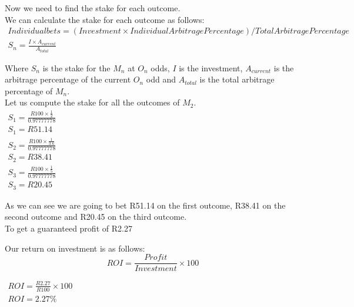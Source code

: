Now we need to find the stake for each outcome. \\
We can calculate the stake for each outcome as follows: \\
\begin{equation}
    \begin{split}
    Individual bets = (Investment \times IndividualArbitragePercentage) / TotalArbitragePercentage \\
    S_{n} = \frac{I \times A_{current}}{A_{total}}
    \end{split}
\end{equation}

Where $S_{n}$ is the stake for the $M_{n}$ at $O_{n}$ odds, $I$ is the investment, $A_{current}$ is the arbitrage percentage of the current $O_{n}$ odd and $A_{total}$ is the total arbitrage percentage of $M_{n}$. \\

Let us compute the stake for all the outcomes of $M_{2}$. \\

\begin{math}
\begin{array}{l}
    S_{1} = \frac{R100 \times \frac{1}{2}}{0.97777778} \\
    S_{1} = R51.14 \\
    S_{2} = \frac{R100 \times \frac{1}{3.6}}{0.97777778} \\
    S_{2} = R38.41 \\
    S_{3} = \frac{R100 \times \frac{1}{5}}{0.97777778} \\
    S_{3} = R20.45
\end{array}
\end{math}

As we can see we are going to bet R51.14 on the first outcome, R38.41 on the second outcome and R20.45 on the third outcome. \\

To get a guaranteed profit of R2.27

Our return on investment is as follows: \\
\begin{equation}
    ROI = \frac{Profit}{Investment} \times 100
\end{equation}

\begin{math}
\begin{array}{l}
    ROI = \frac{R2.27}{R100} \times 100 \\
    ROI = 2.27\%
\end{array}
\end{math} \\

